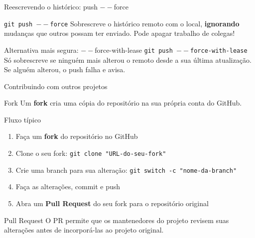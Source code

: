 
\begin{frame}[fragile]{Reescrevendo o histórico: push $--$force}
  \begin{block}{\texttt{git push $--$force}}
    Sobrescreve o histórico remoto com o local, \textbf{ignorando} mudanças que outros possam ter enviado. Pode apagar trabalho de colegas!
  \end{block}
  \begin{alertblock}{Alternativa mais segura: $--$force-with-lease}
    \texttt{git push $--$force-with-lease}
    \vspace{0.2cm} \\
    Só sobrescreve se ninguém mais alterou o remoto desde a sua última atualização. Se alguém alterou, o push falha e avisa.
  \end{alertblock}
\end{frame}

\begin{frame}{Contribuindo com outros projetos}
  \begin{block}{Fork}
    Um \textbf{fork} cria uma cópia do repositório na sua própria conta do GitHub.
  \end{block}
  \begin{block}{Fluxo típico}
    \begin{enumerate}
      \item Faça um \textbf{fork} do repositório no GitHub
      \item Clone o seu fork:
            \texttt{git clone "URL-do-seu-fork"}
      \item Crie uma branch para sua alteração:
            \texttt{git switch -c "nome-da-branch"}
      \item Faça as alterações, commit e push
      \item Abra um \textbf{Pull Request} do seu fork para o repositório original
    \end{enumerate}
  \end{block}
  \begin{alertblock}{Pull Request}
    O PR permite que os mantenedores do projeto revisem suas alterações
    antes de incorporá-las ao projeto original.
  \end{alertblock}
\end{frame}